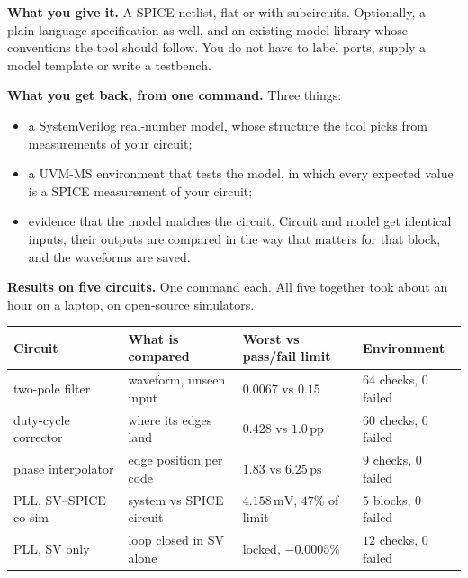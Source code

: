 \documentclass[11pt,a4paper]{article}
\newcommand{\unit}[1]{\,\textrm{#1}}
\begin{document}
\noindent\textbf{What you give it.} A SPICE netlist, flat or with
subcircuits. Optionally, a plain-language specification as well, and an
existing model library whose conventions the tool should follow. You do
not have to label ports, supply a model template or write a
testbench.

\medskip
\noindent\textbf{What you get back, from one command.} Three things:
\begin{itemize}[leftmargin=1.5em,itemsep=0.2em]
  \item a SystemVerilog real-number model, whose structure the tool
        picks from measurements of your circuit;
  \item a UVM-MS environment that tests the model, in which every
        expected value is a SPICE measurement of your circuit;
  \item evidence that the model matches the circuit. Circuit and model
        get identical inputs, their outputs are compared in the way
        that matters for that block, and the waveforms are saved.
\end{itemize}

\medskip
\noindent\textbf{Results on five circuits.} One command each. All
five together took about an hour on a laptop, on open-source
simulators.

\begin{center}
\small
\begin{tabular}{@{}llll@{}}
\toprule
\textbf{Circuit} & \textbf{What is compared} & \textbf{Worst vs pass/fail limit} & \textbf{Environment} \\
\midrule
two-pole filter       & waveform, unseen input   & $0.0067$ vs $0.15$          & $64$ checks, $0$ failed \\
duty-cycle corrector  & where its edges land     & $0.428$ vs $1.0\unit{pp}$   & $60$ checks, $0$ failed \\
phase interpolator    & edge position per code   & $1.83$ vs $6.25\unit{ps}$   & $9$ checks, $0$ failed \\
PLL, SV--SPICE co-sim & system vs SPICE circuit  & $4.158\unit{mV}$, $47\%$ of limit & $5$ blocks, $0$ failed \\
PLL, SV only          & loop closed in SV alone  & locked, $-0.0005\%$         & $12$ checks, $0$ failed \\
\bottomrule
\end{tabular}
\end{center}
\end{document}
